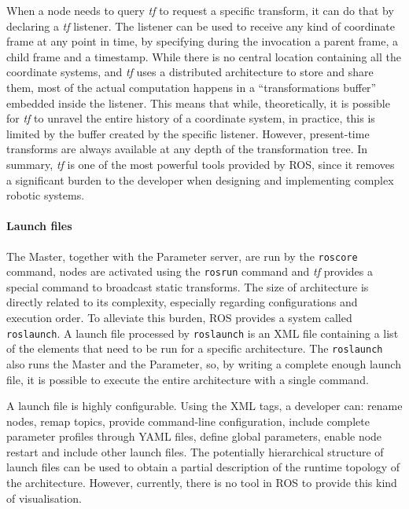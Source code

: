 When a node needs to query \textit{tf} to request a specific transform, it can do that by declaring a \textit{tf} listener. The listener can be used to receive any kind of coordinate frame at any point in time, by specifying during the invocation a parent frame, a child frame and a timestamp. While there is no central location containing all the coordinate systems, and \textit{tf} uses a distributed architecture to store and share them, most of the actual computation happens in a ``transformations buffer'' embedded inside the listener. This means that while, theoretically, it is possible for \textit{tf} to unravel the entire history of a coordinate system, in practice, this is limited by the buffer created by the specific listener. However, present-time transforms are always available at any depth of the transformation tree. In summary, \textit{tf} is one of the most powerful tools provided by ROS, since it removes a significant burden to the developer when designing and implementing complex robotic systems.

\paragraph{Launch files} The Master, together with the Parameter server, are run by the \texttt{roscore} command, nodes are activated using the \texttt{rosrun} command and \textit{tf} provides a special command to broadcast static transforms. The size of architecture is directly related to its complexity, especially regarding configurations and execution order. To alleviate this burden, ROS provides a system called \texttt{roslaunch}. A launch file processed by \texttt{roslaunch} is an XML file containing a list of the elements that need to be run for a specific architecture. The \texttt{roslaunch} also runs the Master and the Parameter, so, by writing a complete enough launch file, it is possible to execute the entire architecture with a single command.

A launch file is highly configurable. Using the XML tags, a developer can: rename nodes, remap topics, provide command-line configuration, include complete parameter profiles through YAML files, define global parameters, enable node restart and include other launch files. The potentially hierarchical structure of launch files can be used to obtain a partial description of the runtime topology of the architecture. However, currently, there is no tool in ROS to provide this kind of visualisation.

